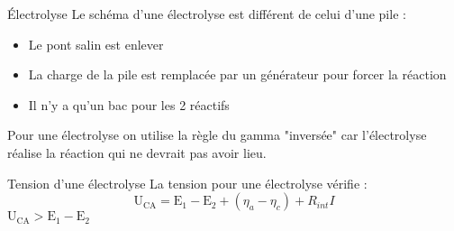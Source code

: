 \documentclass[french, a4paper, 11pt, twocolumn]{article}
\begin{document}
    \begin{cadre}{Électrolyse}
        Le schéma d'une électrolyse est différent de celui d'une pile :
            \begin{itemize}
                \item Le pont salin est enlever
                \item La charge de la pile est remplacée par un générateur pour forcer la réaction
                \item Il n'y a qu'un bac pour les 2 réactifs
            \end{itemize}

        \tcblower
        Pour une électrolyse on utilise la règle du gamma "inversée" car l'électrolyse réalise
        la réaction qui ne devrait pas avoir lieu.
    \end{cadre}

    \begin{cadre}{Tension d'une électrolyse}
        La tension pour une électrolyse vérifie :
            \[\mathrm{U_{CA}=E_1-E_2}+(\eta_a-\eta_c)+R_{int}I\]
        \tcblower
            \(\mathrm{U_{CA}>E_1-E_2}\)
    \end{cadre}
\end{document}

